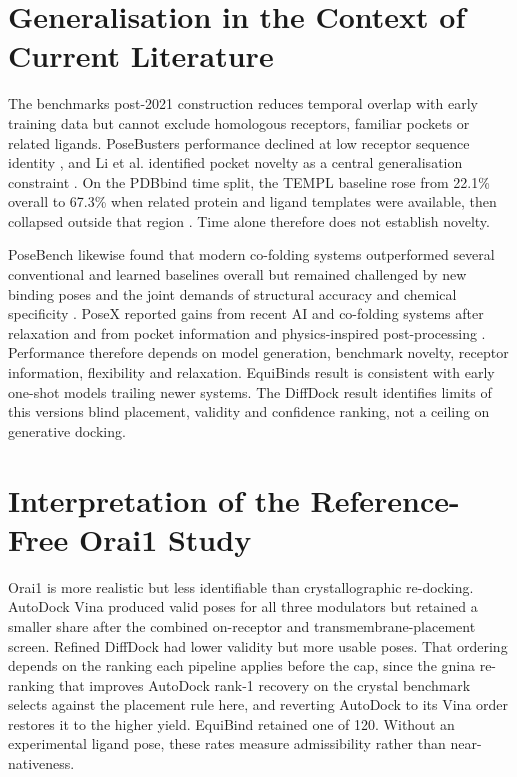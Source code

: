 \hypertarget{generalisation-in-the-context-of-current-literature}{%
\section{Generalisation in the Context of Current Literature}\label{generalisation-in-the-context-of-current-literature}}

The benchmark\textquotesingle s post-2021 construction reduces temporal overlap with early training data but cannot exclude homologous receptors, familiar pockets or related ligands. PoseBusters performance declined at low receptor sequence identity \cite{ref035}, and Li et al. identified pocket novelty as a central generalisation constraint \cite{ref013}. On the PDBbind time split, the TEMPL baseline rose from 22.1\% overall to 67.3\% when related protein and ligand templates were available, then collapsed outside that region \cite{ref065}. Time alone therefore does not establish novelty.

PoseBench likewise found that modern co-folding systems outperformed several conventional and learned baselines overall but remained challenged by new binding poses and the joint demands of structural accuracy and chemical specificity \cite{ref069}. PoseX reported gains from recent AI and co-folding systems after relaxation and from pocket information and physics-inspired post-processing \cite{ref012}. Performance therefore depends on model generation, benchmark novelty, receptor information, flexibility and relaxation. EquiBind\textquotesingle s result is consistent with early one-shot models trailing newer systems. The DiffDock result identifies limits of this version\textquotesingle s blind placement, validity and confidence ranking, not a ceiling on generative docking.

\hypertarget{interpretation-of-the-reference-free-orai1-study}{%
\section{Interpretation of the Reference-Free Orai1 Study}\label{interpretation-of-the-reference-free-orai1-study}}

Orai1 is more realistic but less identifiable than crystallographic re-docking. AutoDock Vina produced valid poses for all three modulators but retained a smaller share after the combined on-receptor and transmembrane-placement screen. Refined DiffDock had lower validity but more usable poses. That ordering depends on the ranking each pipeline applies before the cap, since the gnina re-ranking that improves AutoDock rank-1 recovery on the crystal benchmark selects against the placement rule here, and reverting AutoDock to its Vina order restores it to the higher yield. EquiBind retained one of 120. Without an experimental ligand pose, these rates measure admissibility rather than near-nativeness.

